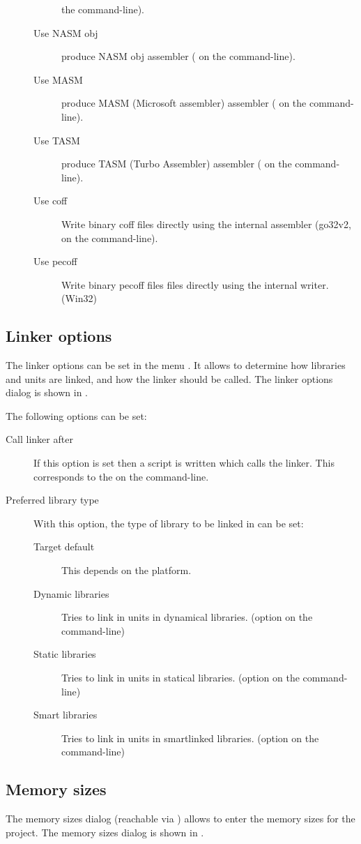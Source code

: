 \begin{description}
\begin{description}
the command-line).
\item[Use NASM obj] produce NASM obj assembler ( on the
command-line).
\item[Use MASM] produce MASM (Microsoft assembler) assembler ( on the
command-line).
\item[Use TASM] produce TASM (Turbo Assembler) assembler ( on the
command-line).
\item[Use coff] Write binary coff files directly using the internal
assembler (go32v2,  on the command-line).
\item[Use pecoff] Write binary pecoff files files directly using the
internal writer. (Win32)
\end{description}
\end{description}
%
%
\subsection{Linker options}
The linker options can be set in the menu . It allows
to determine how libraries and units are linked, and how the linker should
be called.
The linker options dialog is shown in .


The following options can be set:
\begin{description}
\item[Call linker after] If this option is set then a script is written
which calls the linker. This corresponds to the  on the
command-line.
\item[Preferred library type] With this option, the type of library to be
linked in can be set:
\begin{description}
\item[Target default] This depends on the platform.
\item[Dynamic libraries] Tries to link in units in dynamical libraries.
(option  on the command-line)
\item[Static libraries] Tries to link in units in statical libraries.
(option  on the command-line)
\item[Smart libraries] Tries to link in units in smartlinked libraries.
(option  on the command-line)
\end{description}
\end{description}
%
%
\subsection{Memory sizes}
The memory sizes dialog (reachable via ) allows
to enter the memory sizes for the project.
The memory sizes dialog is shown in .


